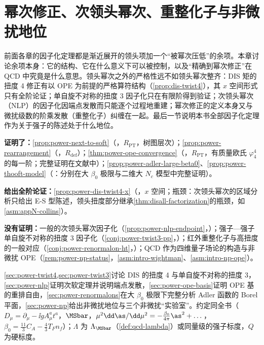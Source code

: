 \chapter{幂次修正、次领头幂次、重整化子与非微扰地位}\label{ch:power}

前面各章的因子化定理都是渐近展开的领头项加一个“被幂次压低”的余项。本章讨论余项本身：它的结构、它在什么意义下可以被控制，以及“精确到幂次修正”在 QCD 中究竟是什么意思。领头幂次之外的严格性远不如领头幂次整齐：DIS 矩的扭度 4 修正有以 OPE 为前提的严格算符结构（\cref{prop:dis-twist4}），其 $x$ 空间形式只有全阶论证；单自旋不对称的扭度 3 因子化只在有限阶得到验证；次领头幂次（NLP）的因子化因端点发散而只能逐个过程地重建；幂次修正的定义本身又与微扰级数的阶乘发散（重整化子）纠缠在一起。最后一节说明本书全部因子化定理作为关于强子的陈述处于什么地位。

\begin{tcolorbox}[enhanced,breakable,title=本章证明了什么／没有证明什么,fonttitle=\bfseries,
  colback=gray!3!white,colframe=gray!55!black,boxrule=0.6pt,arc=2pt,
  left=5pt,right=5pt,top=3pt,bottom=3pt,before skip=6pt,after skip=6pt]
\textbf{证明了：}\cref{prop:power-next-to-soft}（\tagR，$R_{\mathrm{PT}}$，树图层次）；\cref{prop:power-rearrangement}（\tagR，$R_{\mathrm{def}}$）；\cref{thm:power-ope-convergence}（\tagR，$R_{\mathrm{PT}}$，有质量欧氏 $\varphi^4_4$ 的每一阶；完整证明在文献中）；\cref{prop:power-adler-large-beta0}、\cref{prop:power-thooft-model}（\tagP：分别在大 $\beta_0$ 极限与二维大 $N_c$ 模型中完整证明）。\par
\textbf{给出全阶论证：}\cref{prop:power-dis-twist4-x}（\tagA，$x$ 空间；瓶颈：次领头幂次的区域分析只给出 E-S 型陈述，领头扭度部分继承\cref{thm:disall-factorization}的瓶颈，如 \cref{asm:appN-collins}）。\par
\textbf{没有证明：}一般的次领头幂次因子化（\cref{prop:power-nlp-endpoint}，\tagP）；强子—强子单自旋不对称的扭度 3 因子化（\cref{conj:power-twist3-pp}，\tagC）；红外重整化子与高扭度的一般对应（\cref{conj:power-renormalon-ht}，\tagC）；QCD 作为四维量子场论的构造与非微扰 OPE（\cref{rem:power-np-status}，\cref{asm:intro-wightman}、\cref{asm:intro-np-ope}）。
\end{tcolorbox}

\cref{sec:power-twist4,sec:power-twist3}讨论 DIS 的扭度 4 与单自旋不对称的扭度 3，\cref{sec:power-nlp}证明次软定理并说明端点发散，\cref{sec:power-ope-basis}证明 OPE 基的重排自由，\cref{sec:power-renormalons}在大 $\beta_0$ 极限下完整分析 Adler 函数的 Borel 平面，\cref{sec:power-np}给出非微扰地位与三个非微扰“实验室”。约定同全书（$D_\mu=\partial_\mu-\ii gA^a_\mu t^a$，$\MSbar$，$\mu^2\dd\as/\dd\mu^2=-\frac{\beta_0}{4\pi}\as^2+\dots$，$\beta_0=\frac{11}{3}C_A-\frac43T_Fn_f$）；$\Lambda$ 为 $\Lambda_{\MSbar}$（\cref{def:qcd-lambda}）或同量级的强子标度，$Q$ 为硬标度。

